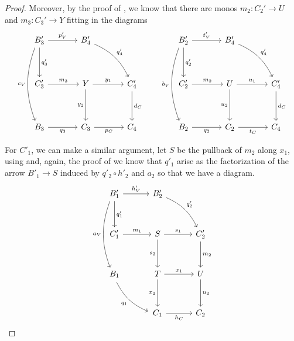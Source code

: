 \begin{proof}
	Moreover, by the proof of , we know that there are monos $m_2:C_2'\to U$ and $m_3:C_3'\to Y$ fitting in the diagrams
	\[\begin{tikzcd}[row sep=18, column sep = 18]
	{B'_3} && {B'_4} \\
	\\
	{C'_3} && Y && {C'_4} \\
	\\
	{B_3} && {C_3} && {C_4}
	\arrow["{p'_V}", from=1-1, to=1-3]
	\arrow["{q'_3}", from=1-1, to=3-1]
	\arrow["{q'_4}", from=1-3, to=3-5, bend left = 20]
	\arrow["{m_3}", from=3-1, to=3-3]
	\arrow["{y_1}", from=3-3, to=3-5]
	\arrow["{y_2}"', from=3-3, to=5-3]
	\arrow["{d_C}", from=3-5, to=5-5]
	\arrow["{q_3}"', from=5-1, to=5-3]
	\arrow["{p_C}"', from=5-3, to=5-5]
        \arrow["{c_V}"', from=1-1, to=5-1, bend right = 20, shift right=1]
	\end{tikzcd}\qquad\begin{tikzcd}[row sep=18, column sep = 18]
	{B'_2} && {B'_4} \\
	\\
	{C'_2} && U && {C'_4} \\
	\\
	{B_2} && {C_2} && {C_4}
	\arrow["{t'_V}", from=1-1, to=1-3]
	\arrow["{q'_2}", from=1-1, to=3-1]
	\arrow["{q'_4}", from=1-3, to=3-5, bend left = 20]
	\arrow["{m_2}", from=3-1, to=3-3]
	\arrow["{u_1}", from=3-3, to=3-5]
	\arrow["{u_2}"', from=3-3, to=5-3]
	\arrow["{d_C}", from=3-5, to=5-5]
	\arrow["{q_2}"', from=5-1, to=5-3]
	\arrow["{t_C}"', from=5-3, to=5-5]
        \arrow["{b_V}"', from=1-1, to=5-1, bend right = 20, shift right = 1]
	\end{tikzcd}\]

	For $C'_1$, we can make a similar argument, let $S$ be the pullback of $m_2$ along $x_1$, using  and, again, the proof of  we know that $q'_1$ arise as the factorization of the arrow $B'_1\to S$ induced by $q'_2\circ h'_2$ and $a_2$ so that we have a diagram.
	\[\begin{tikzcd}[row sep = 16, column sep =16]
	{B'_1} && {B'_2} \\
	\\
	{C'_1} && S && {C'_2} \\
	\\
	{B_1} && T && U \\
	\\
	&& {C_1} && {C_2}
	\arrow["{h'_V}", from=1-1, to=1-3]
	\arrow["{q'_1}", from=1-1, to=3-1]
	\arrow["{q'_2}", from=1-3, to=3-5, bend left = 20]
	\arrow["{m_1}", from=3-1, to=3-3]
	\arrow["{s_1}", from=3-3, to=3-5]
	\arrow["{s_2}"', from=3-3, to=5-3]
	\arrow["{m_2}", from=3-5, to=5-5]
	\arrow["{q_1}"', from=5-1, to=7-3, bend right = 20, shift right = 1]
	\arrow["{x_1}", from=5-3, to=5-5]
	\arrow["{x_2}"', from=5-3, to=7-3]
	\arrow["{u_2}", from=5-5, to=7-5]
	\arrow["{h_C}"', from=7-3, to=7-5]
        \arrow["{a_V}"', from=1-1, to=5-1, bend right = 20, shift right = 1]
	\end{tikzcd}\]
	

\end{proof}
